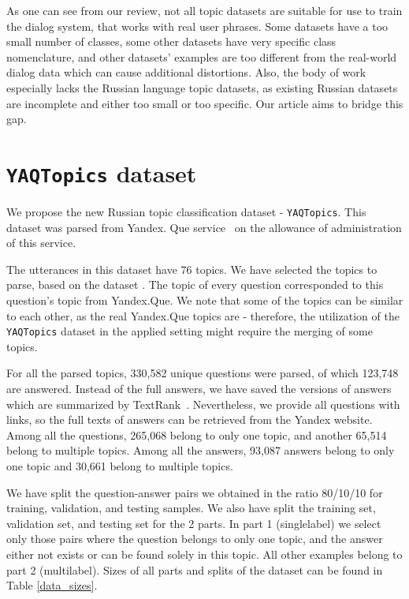 As one can see from our review, not all topic datasets are suitable for use to train the dialog system, that works with real user phrases. Some datasets have a too small number of classes, some other datasets have very specific class nomenclature, and other datasets' examples are too different from the real-world dialog data which can cause additional distortions. Also, the body of work especially lacks the Russian language topic datasets, as existing Russian datasets are incomplete and either too small or too specific. Our article aims to bridge this gap. 


\section{\texttt{YAQTopics} dataset} 
We propose the new Russian topic classification dataset - \texttt{YAQTopics}. This dataset was parsed from Yandex. Que service~\cite{yandex_q} on the allowance of administration of this service. 

The utterances in this dataset have 76 topics. We have selected the topics to parse, based on the dataset \cite{dp_topics}. The topic of every question corresponded to this question's topic from Yandex.Que. We note that some of the topics can be similar to each other, as the real Yandex.Que topics are - therefore, the utilization of the \texttt{YAQTopics} dataset in the applied setting might require the merging of some topics. 

 For all the parsed topics, 330,582 unique questions were parsed, of which 123,748 are answered. Instead of the full answers, we have saved the versions of answers which are summarized by TextRank~\cite{summarizer}. Nevertheless, we provide all questions with links, so the full texts of answers can be retrieved from the Yandex website.
Among all the questions, 265,068 belong to only one topic, and another 65,514 belong to multiple topics. Among all the answers, 93,087 answers belong to only one topic and 30,661 belong to multiple topics. 


 We have split the question-answer pairs we obtained in the ratio 80/10/10 for training, validation, and testing samples. We also have split the training set, validation set, and testing set for the 2 parts. In part 1 (singlelabel) we select only those pairs where the question belongs to only one topic, and the answer either not exists or can be found solely in this topic. All other examples belong to part 2 (multilabel). 
Sizes of all parts and splits of the dataset can be found in Table \ref{data_sizes}. 

